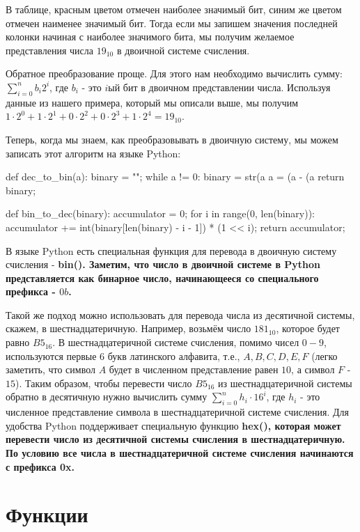 В таблице, красным цветом отмечен наиболее значимый бит, синим же 
цветом отмечен наименее значимый бит. Тогда если мы запишем значения
последней колонки начиная с наиболее значимого бита, мы получим 
желаемое представления числа $19_{10}$ в двоичной системе счисления. 

Обратное преобразование проще. Для этого нам необходимо вычислить сумму:
$\sum_{i=0}^n b_i2^i$, где $b_i$ - это $i$ый бит в двоичном представлении
числа. Используя данные из нашего примера, который мы описали выше, мы 
получим $1\cdot2^0+1\cdot2^1+0\cdot2^2+0\cdot2^3+1\cdot2^4 = 19_{10}$.

Теперь, когда мы знаем, как преобразовывать в двоичную систему, мы можем записать
этот алгоритм на языке Python:

\begin{python}
def dec_to_bin(a):
	binary = "";
	while a != 0:
		binary = str(a %
		a = (a - (a %
	return binary;

def bin_to_dec(binary):
	accumulator = 0;
	for i in range(0, len(binary)):
		accumulator += int(binary[len(binary) - i - 1]) * (1 << i);
	return accumulator;
\end{python}

В языке Python есть специальная функция для перевода в двоичную систему счисления - \bf{bin()}.
Заметим, что число в двоичной системе в Python представляется как бинарное число, начинающееся со 
специального префикса - $0b$.

Такой же подход можно использовать для перевода числа из десятичной системы, скажем, в 
шестнадцатеричную. Например, возьмём число $181_{10}$, которое будет равно $B5_{16}$. 
В шестнадцатеричной системе счисления, помимо чисел $0-9$, используются первые $6$ букв 
латинского алфавита, т.е., $A, B, C, D, E, F$ (легко заметить, что символ $A$ будет в численном 
представление равен $10$, а символ $F$ - $15$). Таким образом, чтобы перевести число $B5_{16}$ из
шестнадцатеричной системы обратно в десятичную нужно вычислить сумму $\sum_{i=0}^{n} h_i \cdot 16^i$,
где $h_i$ - это численное представление символа в шестнадцатеричной системе счисления.
Для удобства Python поддерживает специальную функцию \bf{hex()}, которая может перевести 
число из десятичной системы счисления в шестнадцатеричную. По условию все числа в шестнадцатеричной 
системе счисления начинаются с префикса \bf{0x}.

\section{Функции}

